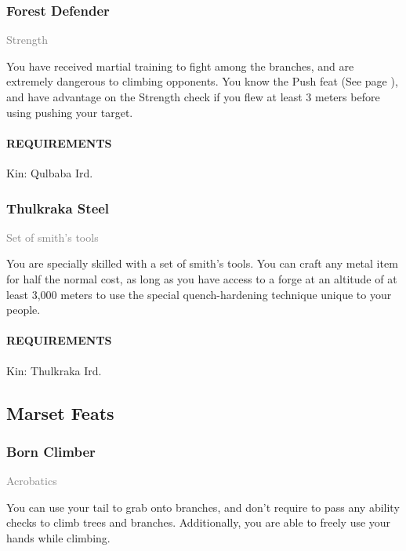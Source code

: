     \subsubsection{Forest Defender} \label{feat::forestdefender}
    \small{\textcolor{gray}{Strength}}

    \normalsize
    You have received martial training to fight among the branches, and are extremely dangerous to climbing opponents.
    You know the Push feat (See page \pageref{feat::push}), and have advantage on the Strength check if you flew at least 3 meters before using pushing your target.
    \paragraph{REQUIREMENTS} Kin: Qulbaba Ird.

    \subsubsection{Thulkraka Steel} \label{feat::thulkrakasteel}
    \small{\textcolor{gray}{Set of smith's tools}}

    \normalsize
    You are specially skilled with a set of smith's tools.
    You can craft any metal item for half the normal cost, as long as you have access to a forge at an altitude of at least 3,000 meters to use the special quench-hardening technique unique to your people.
    \paragraph{REQUIREMENTS} Kin: Thulkraka Ird.

\subsection*{Marset Feats}
    \subsubsection{Born Climber} \label{feat::bornclimber}
    \small{\textcolor{gray}{Acrobatics}}

    \normalsize
    You can use your tail to grab onto branches, and don't require to pass any ability checks to climb trees and branches.
    Additionally, you are able to freely use your hands while climbing.
